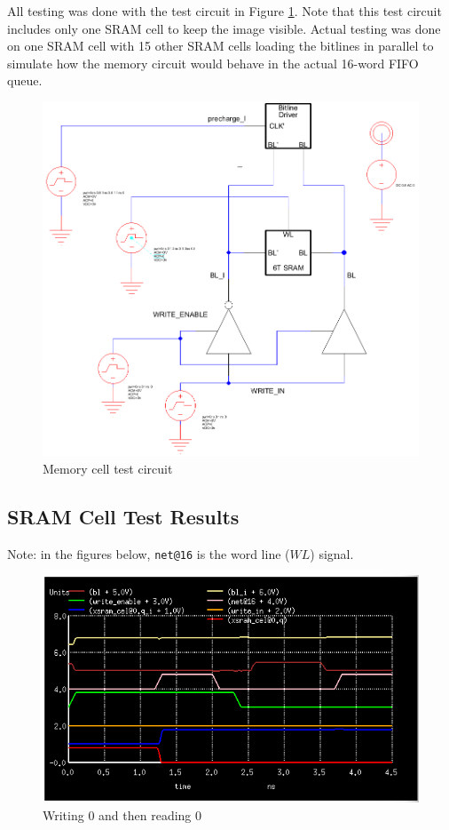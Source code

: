 \documentclass[12pt]{report}
\begin{document}
All testing was done with the test circuit in Figure \ref{fig:test_circuit}. Note that this test circuit includes only one SRAM cell to keep the image visible. Actual testing was done on one SRAM cell with 15 other SRAM cells loading the bitlines in parallel to simulate how the memory circuit would behave in the actual 16-word FIFO queue.

\begin{figure}[H]
  \centering
    \includegraphics[width=1.0\textwidth]{test_circuit.PNG}
  \caption{Memory cell test circuit}
  \label{fig:test_circuit}
\end{figure}

\subsection*{SRAM Cell Test Results}
Note: in the figures below, \texttt{net@16} is the word line ($WL$) signal.
\begin{figure}[H]
  \centering
    \includegraphics[width=1.0\textwidth]{write_0_then_read_0.png}
  \caption{Writing 0 and then reading 0}
  \label{fig:write_0_then_read_0}
\end{figure}
\end{document}
